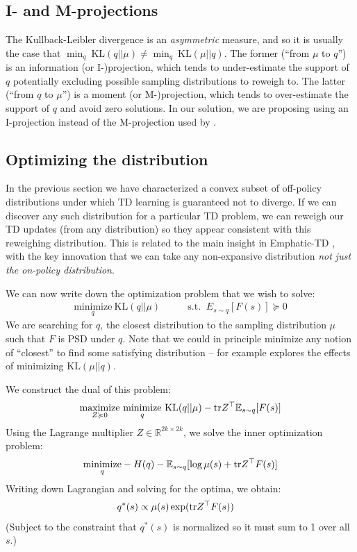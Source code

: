 \subsection{I- and M-projections} \label{sec:improj}
The Kullback-Leibler divergence is an \emph{asymmetric} measure, and so it is usually the case that $\min_q~\text{KL}(q||\mu) \neq \min_q~\text{KL}(\mu||q)$. The former (``from $\mu$ to $q$'') is an information (or I-)projection, which tends to under-estimate the support of $q$ potentially excluding possible sampling distributions to reweigh to. The latter (``from $q$ to $\mu$'') is a moment (or M-)projection, which tends to over-estimate the support of $q$ and avoid zero solutions. In our solution, we are proposing using an I-projection instead of the M-projection used by \citet{kolter2011fixed}.


\subsection{Optimizing the distribution}
\label{sec:distriboptim}

In the previous section we have characterized a convex subset of off-policy distributions under which TD learning is guaranteed not to diverge. If we can discover any such distribution for a particular TD problem, we can reweigh our TD updates (from any distribution) so they appear consistent with this reweighing distribution. This is related to the main insight in Emphatic-TD \citep{sutton2016emphatic}, with the key innovation that we can take any non-expansive distribution \emph{not just the on-policy distribution}.

We can now write down the optimization problem that we wish to solve:
\begin{align}
  \underset{q}{\text{minimize}}~\text{KL}(q||\mu) & \qquad \text{s.t. } ~ E_{s\sim q}[F(s)] \succcurlyeq 0
\end{align}
We are searching for $q$, the closest distribution to the sampling distribution $\mu$ such that $F$ is PSD under $q$. Note that we could in principle minimize any notion of ``closest'' to find some satisfying distribution -- for example \citet{kolter2011fixed} explores the effects of minimizing $\text{KL}(\mu||q)$.

We construct the dual of this problem:
\begin{align}
  \underset{Z\succcurlyeq 0}{\text{maximize}}~ \underset{q}{\text{minimize}}~\text{KL}(q||\mu) - \text{tr} Z^\top \mathbb{E}_{s\sim q}[F(s)]
\end{align}
Using the Lagrange multiplier $Z\in\mathbb R^{2k\times 2k}$, we solve the inner optimization problem:
\begin{align}
  \underset{q}{\text{minimize}} - H(q) - \mathbb{E}_{s\sim q}[\log \mu(s) + \text{tr} Z^\top F(s)]
\end{align}
Writing down Lagrangian and solving for the optima, we obtain:
\begin{align}
  q^*(s) & \propto \mu(s)\exp( \text{tr} Z^\top F(s))
\end{align}
(Subject to the constraint that $q^*(s)$ is normalized so it must sum to 1 over all $s$.)


